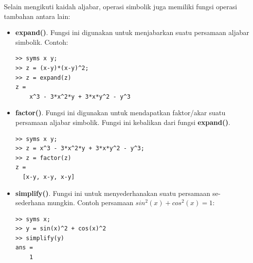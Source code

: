 \documentclass[12pt]{book}
\begin{document}
	Selain mengikuti kaidah aljabar, operasi simbolik juga memiliki fungsi operasi tambahan antara lain:
	\begin{itemize}
		\item \textbf{expand()}. Fungsi ini digunakan untuk menjabarkan suatu persamaan aljabar simbolik.
		Contoh:
		\begin{verbatim}
>> syms x y;
>> z = (x-y)*(x-y)^2;
>> z = expand(z)
z =
    x^3 - 3*x^2*y + 3*x*y^2 - y^3
		\end{verbatim}
	
		\item \textbf{factor()}. Fungsi ini digunakan untuk mendapatkan faktor/akar suatu persamaan aljabar simbolik.
		Fungsi ini kebalikan dari fungsi \textbf{expand()}.
		\begin{verbatim}
>> syms x y;
>> z = x^3 - 3*x^2*y + 3*x*y^2 - y^3;
>> z = factor(z)
z =
  [x-y, x-y, x-y]
		\end{verbatim}
	
		\item \textbf{simplify()}. Fungsi ini untuk menyederhanakan suatu persamaan se-sederhana mungkin.
		Contoh persamaan $sin^{2}(x) + cos^{2}(x) = 1$:
		\begin{verbatim}
>> syms x;
>> y = sin(x)^2 + cos(x)^2
>> simplify(y)
ans = 
    1
		\end{verbatim}
	\end{itemize}
\end{document}
